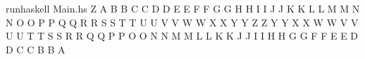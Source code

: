 \begin{term}[frame=none]
runhaskell Main.hs Z\rk
                         A
                        B B
                       C   C
                      D     D
                     E       E
                    F         F
                   G           G
                  H             H
                 I               I
                J                 J
               K                   K
              L                     L
             M                       M
            N                         N
           O                           O
          P                             P
         Q                               Q
        R                                 R
       S                                   S
      T                                     T
     U                                       U
    V                                         V
   W                                           W
  X                                             X
 Y                                               Y
Z                                                 Z
 Y                                               Y
  X                                             X
   W                                           W
    V                                         V
     U                                       U
      T                                     T
       S                                   S
        R                                 R
         Q                               Q
          P                             P
           O                           O
            N                         N
             M                       M
              L                     L
               K                   K
                J                 J
                 I               I
                  H             H
                   G           G
                    F         F
                     E       E
                      D     D
                       C   C
                        B B
                         A
\end{term}
\stopasking
